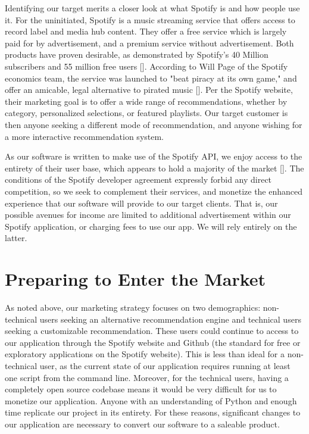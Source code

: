 \documentclass{roffin}
\begin{document}
Identifying our target merits a closer look at what Spotify is and how people use it.  For the uninitiated, Spotify is a music streaming service that offers access to record label and media hub content.  They offer a free service which is largely paid for by advertisement, and a premium service without advertisement.  Both products have proven desirable, as demonstrated by Spotify's 40 Million subscribers and 55 million free users [\cite{digital_trends}].  According to Will Page of the Spotify economics team, the service was launched to "beat piracy at its own game," and offer an amicable, legal alternative to pirated music [\cite{adventures}].  Per the Spotify website, their marketing goal is to offer a wide range of recommendations, whether by category, personalized selections, or featured playlists.  Our target customer is then anyone seeking a different mode of recommendation, and anyone wishing for a more interactive recommendation system.

As our software is written to make use of the Spotify API, we enjoy access to the entirety of their user base, which appears to hold a majority of the market [\cite{digital_trends}].  The conditions of the Spotify developer agreement expressly forbid any direct competition, so we seek to complement their services, and monetize the enhanced experience that our software will provide to our target clients.  That is, our possible avenues for income are limited to additional advertisement within our Spotify application, or charging fees to use our app.  We will rely entirely on the latter.

\section{Preparing to Enter the Market}

As noted above, our marketing strategy focuses on two demographics: non-technical users seeking an alternative recommendation engine and technical users seeking a customizable recommendation.  These users could continue to access to our application through the Spotify website and Github (the standard for free or exploratory applications on the Spotify website).  This is less than ideal for a non-technical user, as the current state of our application requires running at least one script from the command line.  Moreover, for the technical users, having a completely open source codebase means it would be very difficult for us to monetize our application.  Anyone with an understanding of Python and enough time replicate our project in its entirety.  For these reasons, significant changes to our application are necessary to convert our software to a saleable product.
\end{document}
